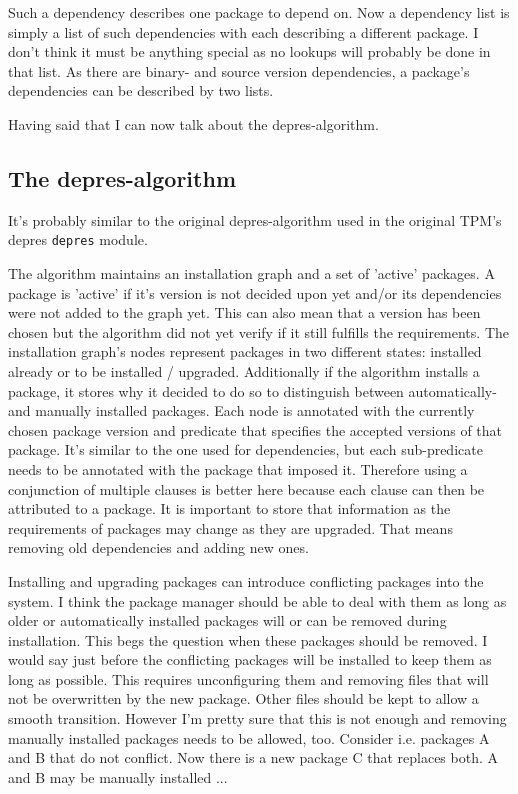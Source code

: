 \documentclass[a4paper]{scrartcl}
\newcommand{\module}[1]{\texttt{#1}}
\begin{document}
	Such a dependency describes one package to depend on. Now a dependency list is simply a list of such dependencies with each describing a different package. I don't think it must be anything special as no lookups will probably be done in that list. As there are binary- and source version dependencies, a package's dependencies can be described by two lists.
	
	Having said that I can now talk about the depres-algorithm.
	
	
	\subsection{The depres-algorithm}
	\label{ssec:the_depres_algorithm}
	
	It's probably similar to the original depres-algorithm used in the original TPM's depres \module{depres} module.
	
	The algorithm maintains an installation graph and a set of 'active' packages. A package is 'active' if it's version is not decided upon yet and/or its dependencies were not added to the graph yet. This can also mean that a version has been chosen but the algorithm did not yet verify if it still fulfills the requirements. The installation graph's nodes represent packages in two different states: installed already or to be installed / upgraded. Additionally if the algorithm installs a package, it stores why it decided to do so to distinguish between automatically- and manually installed packages. Each node is annotated with the currently chosen package version and predicate that specifies the accepted versions of that package. It's similar to the one used for dependencies, but each sub-predicate needs to be annotated with the package that imposed it. Therefore using a conjunction of multiple clauses is better here because each clause can then be attributed to a package. It is important to store that information as the requirements of packages may change as they are upgraded. That means removing old dependencies and adding new ones.
	
	Installing and upgrading packages can introduce conflicting packages into the system. I think the package manager should be able to deal with them as long as older or automatically installed packages will or can be removed during installation. This begs the question when these packages should be removed. I would say just before the conflicting packages will be installed to keep them as long as possible. This requires unconfiguring them and removing files that will not be overwritten by the new package. Other files should be kept to allow a smooth transition. However I'm pretty sure that this is not enough and removing manually installed packages needs to be allowed, too. Consider i.e. packages A and B that do not conflict. Now there is a new package C that replaces both. A and B may be manually installed ...
	
\end{document}
